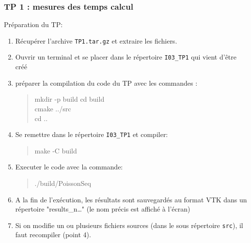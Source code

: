 \documentclass{beamer}
\begin{document}
\begin{frame}
	\frametitle{TP 1 : mesures des temps calcul}
	
	Pr\'eparation du TP:
	\vfill
	\begin{enumerate}
		\item R\'ecup\'erer l'archive {\tt TP1.tar.gz} et extraire les fichiers.
		\item Ouvrir un terminal et se placer dans le r\'epertoire {\tt I03\_TP1} qui vient d'\^etre cr\'e\'e
		\item préparer la compilation du code du TP avec les commandes :
		\begin{quote}
			mkdir -p build
			cd build\\
			cmake ../src\\
			cd ..
		\end{quote}
		\item Se remettre dans le r\'epertoire {\tt I03\_TP1} et compiler:
		\begin{quote}
			make -C build
		\end{quote}
	\end{enumerate}
	
\end{frame}
\begin{frame}
	\begin{enumerate}
  		\setcounter{enumi}{4}
		\item Executer le code avec la commande:
		\begin{quote}
			./build/PoissonSeq
		\end{quote}
		\item A la fin de l'exécution, les résultats sont sauvegardés au format VTK dans un répertoire "results\_n\ldots" (le nom précis est affiché à l'écran)

		\item Si on modifie un ou plusieurs fichiers sources (dans le sous r\'epertoire {\tt 	src}), il faut recompiler (point 4).
	\end{enumerate}
\end{frame}
	
\end{document}
